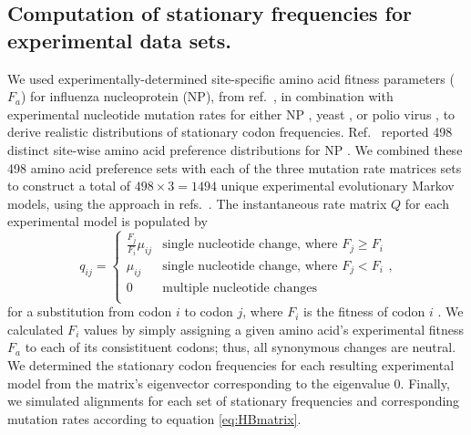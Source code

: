 \documentclass[11pt]{article}
\begin{document}
\subsection*{Computation of stationary frequencies for experimental data sets.}
We used experimentally-determined site-specific amino acid fitness parameters ($F_a$) for influenza nucleoprotein (NP), from ref.\ \cite{Bloom2014a}, in combination with experimental nucleotide mutation rates for either NP \cite{Bloom2014a}, yeast \cite{Zhu2014}, or polio virus \cite{Acevedo2014}, to derive realistic distributions of stationary codon frequencies. Ref.\ \cite{Bloom2014a} reported 498 distinct site-wise amino acid preference distributions for NP \cite{Bloom2014a}. We combined these 498 amino acid preference sets with each of the three mutation rate matrices sets to construct a total of $498 \times 3 = 1494$ unique experimental evolutionary Markov models, using the approach in refs.\ \cite{Bloom2014a,Bloom2014b}. The instantaneous rate matrix $Q$ for each experimental model is populated by 
\begin{equation}
q_{ij} =  \left\{ 
\begin{array}{rl}
  \frac{F_j}{F_i}\mu_{ij} &\mbox{single nucleotide change, where $F_j \geq F_i$} \\
  \mu_{ij}                &\mbox{single nucleotide change, where $F_j < F_i$}  \\ 
  0                       &\mbox{multiple nucleotide changes} \\        
\end{array} \right.,
\end{equation}
for a substitution from codon $i$ to codon $j$, where $F_i$ is the fitness of codon $i$ \cite{Bloom2014a,Bloom2014b}. We calculated $F_i$ values by simply assigning a given amino acid's experimental fitness $F_a$ to each of its consistituent codons; thus, all synonymous changes are neutral. We determined the stationary codon frequencies for each resulting experimental model from the matrix's eigenvector corresponding to the eigenvalue 0. Finally, we simulated alignments for each set of stationary frequencies and corresponding mutation rates according to equation \eqref{eq:HBmatrix}.   

		
\end{document}
